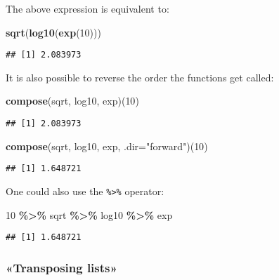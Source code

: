 \documentclass[
]{article}
\newenvironment{Shaded}{\begin{snugshade}}{\end{snugshade}}
\newcommand{\DataTypeTok}[1]{\textcolor[rgb]{0.13,0.29,0.53}{#1}}
\newcommand{\DecValTok}[1]{\textcolor[rgb]{0.00,0.00,0.81}{#1}}
\newcommand{\KeywordTok}[1]{\textcolor[rgb]{0.13,0.29,0.53}{\textbf{#1}}}
\newcommand{\NormalTok}[1]{#1}
\newcommand{\OperatorTok}[1]{\textcolor[rgb]{0.81,0.36,0.00}{\textbf{#1}}}
\newcommand{\StringTok}[1]{\textcolor[rgb]{0.31,0.60,0.02}{#1}}
\begin{document}
The above expression is equivalent to:

\begin{Shaded}
\begin{Highlighting}[]
\KeywordTok{sqrt}\NormalTok{(}\KeywordTok{log10}\NormalTok{(}\KeywordTok{exp}\NormalTok{(}\DecValTok{10}\NormalTok{)))}
\end{Highlighting}
\end{Shaded}

\begin{verbatim}
## [1] 2.083973
\end{verbatim}

It is also possible to reverse the order the functions get called:

\begin{Shaded}
\begin{Highlighting}[]
\KeywordTok{compose}\NormalTok{(sqrt, log10, exp)(}\DecValTok{10}\NormalTok{)}
\end{Highlighting}
\end{Shaded}

\begin{verbatim}
## [1] 2.083973
\end{verbatim}

\begin{Shaded}
\begin{Highlighting}[]
\KeywordTok{compose}\NormalTok{(sqrt, log10, exp, }\DataTypeTok{.dir=}\StringTok{"forward"}\NormalTok{)(}\DecValTok{10}\NormalTok{)}
\end{Highlighting}
\end{Shaded}

\begin{verbatim}
## [1] 1.648721
\end{verbatim}

One could also use the \texttt{\%\textgreater{}\%} operator:

\begin{Shaded}
\begin{Highlighting}[]
\DecValTok{10} \OperatorTok{\%\textgreater{}\%}
\StringTok{  }\NormalTok{sqrt }\OperatorTok{\%\textgreater{}\%}
\StringTok{  }\NormalTok{log10 }\OperatorTok{\%\textgreater{}\%}
\StringTok{  }\NormalTok{exp}
\end{Highlighting}
\end{Shaded}

\begin{verbatim}
## [1] 1.648721
\end{verbatim}

\hypertarget{transposing-lists}{%
\subsubsection{«Transposing lists»}\label{transposing-lists}}
\end{document}
